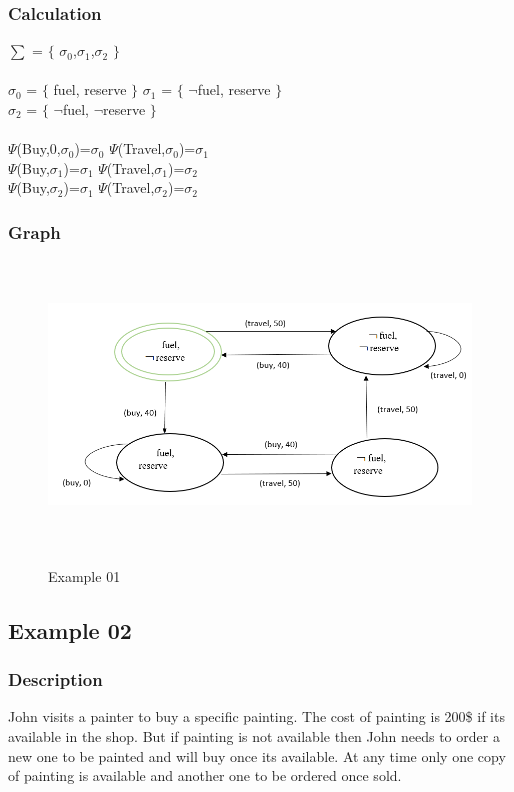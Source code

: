 \documentclass[11pt]{article}
\begin{document}
	\subsubsection{Calculation}\label{par:p301}\par
	$\sum$ = $\lbrace$ $\sigma_{0}$,$\sigma_{1}$,$\sigma_{2}$ $\rbrace$\\ \\
	$\sigma_{0}$ = $\lbrace$ fuel, reserve $\rbrace$ \indent $\sigma_{1}$ = $\lbrace$ $\neg$fuel, reserve $\rbrace$\\
	$\sigma_{2}$ = $\lbrace$ $\neg$fuel, $\neg$reserve $\rbrace$ 
	\\ \\
	$\Psi$(Buy,0,$\sigma_{0}$)=$\sigma_{0}$ \indent $\Psi$(Travel,$\sigma_{0}$)=$\sigma_{1}$\\
	$\Psi$(Buy,$\sigma_{1}$)=$\sigma_{1}$ \indent $\Psi$(Travel,$\sigma_{1}$)=$\sigma_{2}$\\
	$\Psi$(Buy,$\sigma_{2}$)=$\sigma_{1}$ \indent $\Psi$(Travel,$\sigma_{2}$)=$\sigma_{2}$\\
	\subsubsection{Graph}\label{par:p401}
	\begin{figure}[H]
		\centering
		\includegraphics[width=6in,height=3in]{./media/ex01.png}
		\label{Figure:f01}
		\caption{Example 01}
	\end{figure}
	\subsection{Example 02}\label{example:ex02}
	\subsubsection{Description}\label{par:p102}
	John visits a painter to buy a specific painting. The cost of painting is 200\$ if its available in the shop. But if painting is not available then John needs to order a new one to be painted and will buy once its available. At any time only one copy of painting is available and another one to be ordered once sold. 
	
\end{document}

